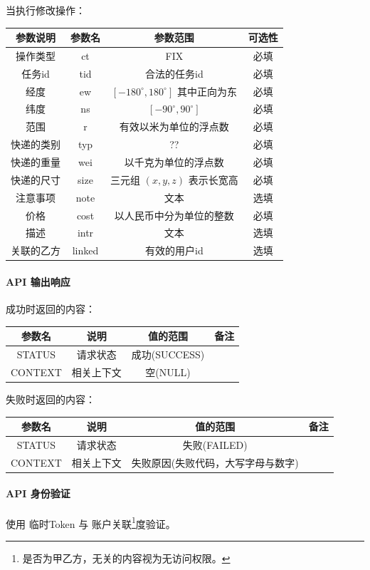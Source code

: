 \documentclass[UTF8]{article}
\def\apiresp{\paragraph{\colorbox[rgb]{0.9,0.9,1}{API 输出响应}}} %
\def\apiauth{\paragraph{\colorbox[rgb]{0.45,0.9,1}{API 身份验证}}} %
\def\失败{\colorbox[rgb]{1,0.5,0.5}{失败}}
\def\成功{\colorbox[rgb]{0.4,1,0.5}{成功}}
\def\成功V{成功(SUCCESS)}
\def\失败V{失败(FAILED)}
\def\失败原因{失败原因(失败代码，大写字母与数字)}
\def\空{空(NULL)}
\begin{document}
    \par 当执行修改操作： \\
    \begin{tabular}{|c|c|c|c|}
        \hline \rule[-2ex]{0pt}{5.5ex} 参数说明 & 参数名 & 参数范围 & 可选性 \\
        \hline \rule[-2ex]{0pt}{5.5ex} 操作类型 & ct & FIX & 必填 \\
        \hline \rule[-2ex]{0pt}{5.5ex} 任务id & tid & 合法的任务id & 必填 \\
        \hline \rule[-2ex]{0pt}{5.5ex} 经度 & ew & $[-180^\circ,180^\circ]$ 其中正向为东 & 必填 \\
        \hline \rule[-2ex]{0pt}{5.5ex} 纬度 & ns & $[-90^\circ,90^\circ]$ & 必填 \\
        \hline \rule[-2ex]{0pt}{5.5ex} 范围 & r & 有效以米为单位的浮点数 & 必填 \\
        \hline \rule[-2ex]{0pt}{5.5ex} 快递的类别 & typ & ?? & 必填 \\
        \hline \rule[-2ex]{0pt}{5.5ex} 快递的重量 & wei & 以千克为单位的浮点数 & 必填 \\
        \hline \rule[-2ex]{0pt}{5.5ex} 快递的尺寸 & size & 三元组 $(x,y,z)$ 表示长宽高 & 必填 \\
        \hline \rule[-2ex]{0pt}{5.5ex} 注意事项 & note & 文本 & 选填 \\
        \hline \rule[-2ex]{0pt}{5.5ex} 价格 & cost & 以人民币中分为单位的整数 & 必填 \\
        \hline \rule[-2ex]{0pt}{5.5ex} 描述 & intr & 文本 & 选填 \\
        \hline \rule[-2ex]{0pt}{5.5ex} 关联的乙方 & linked & 有效的用户id & 选填 \\
        \hline 
    \end{tabular} 
    \apiresp
    \成功 时返回的内容：\\
    \begin{tabular}{|c|c|c|c|}
        \hline \rule[-2ex]{0pt}{5.5ex} 参数名 & 说明 & 值的范围 & 备注 \\
        \hline \rule[-2ex]{0pt}{5.5ex} STATUS & 请求状态 & \成功V &  \\ 
        \hline \rule[-2ex]{0pt}{5.5ex} CONTEXT & 相关上下文 & \空 &  \\
        \hline 
    \end{tabular} 
    \par \失败 时返回的内容：\\
    \begin{tabular}{|c|c|c|c|}
        \hline \rule[-2ex]{0pt}{5.5ex} 参数名 & 说明 & 值的范围 & 备注 \\
        \hline \rule[-2ex]{0pt}{5.5ex} STATUS & 请求状态 & \失败V &  \\ 
        \hline \rule[-2ex]{0pt}{5.5ex} CONTEXT & 相关上下文 & \失败原因 &  \\
        \hline 
    \end{tabular}
    \apiauth
    使用 临时Token 与 账户关联\footnote{是否为甲乙方，无关的内容视为无访问权限。}度验证。
\end{document}
